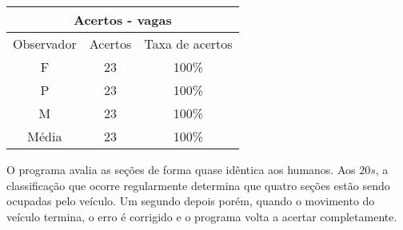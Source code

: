 \begin{center}
\begin{tabular}{|c||c||c|}
\hline
\multicolumn{3}{|c|}{Acertos - vagas}  \\ \hline \hline
Observador & Acertos & Taxa de acertos \\ \hline
F & 23 & 100\% \\  \hline
P & 23 & 100\% \\ \hline
M & 23 & 100\% \\ \hline
Média & 23 & 100\% \\
\hline
\end{tabular}
\end{center}

O programa avalia as seções de forma quase idêntica aos humanos. Aos $20s$, a classificação que ocorre regularmente determina que quatro seções estão sendo ocupadas pelo veículo. Um segundo depois porém, quando o movimento do veículo termina, o erro é corrigido e o programa volta a acertar completamente.











